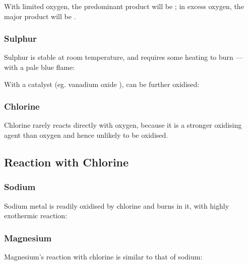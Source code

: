 				With limited oxygen, the predominant product will be ; in excess oxygen, the major product will be .


			\pagebreak
			\subsubsection{Sulphur}

				Sulphur is stable at room temperature, and requires some heating to burn --- with a pale blue flame:


				With a catalyst (eg. vanadium oxide ),  can be further oxidised:



			\subsubsection{Chlorine}

				Chlorine rarely reacts directly with oxygen, because it is a stronger oxidising agent than oxygen and hence unlikely to be
				oxidised.



		\subsection{Reaction with Chlorine}

			\subsubsection{Sodium}

				Sodium metal is readily oxidised by chlorine and burns in it, with highly exothermic reaction:



			\subsubsection{Magnesium}

				Magnesium's reaction with chlorine is similar to that of sodium:

